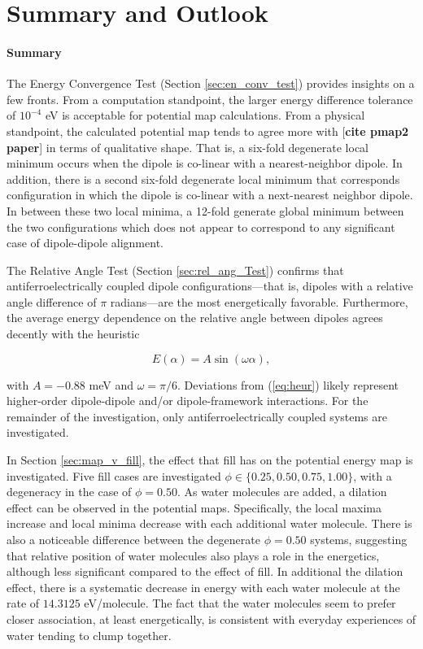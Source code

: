     \section{Summary and Outlook}
    
    \paragraph{Summary} The Energy Convergence Test (Section \ref{sec:en_conv_test}) provides insights on a few fronts. From a computation standpoint, the larger energy difference tolerance of $10^{-4}$ eV is acceptable for potential map calculations. From a physical standpoint, the calculated potential map tends to agree more with [\textbf{cite pmap2 paper}] in terms of qualitative shape. That is, a six-fold degenerate local minimum occurs when the dipole is co-linear with a nearest-neighbor dipole. In addition, there is a second six-fold degenerate local minimum that corresponds configuration in which the dipole is co-linear with a next-nearest neighbor dipole. In between these two local minima, a 12-fold generate global minimum between the two configurations which does not appear to correspond to any significant case of dipole-dipole alignment.
    
    The Relative Angle Test (Section \ref{sec:rel_ang_Test}) confirms that antiferroelectrically coupled dipole configurations---that is, dipoles with a relative angle difference of $\pi$ radians---are the most energetically favorable. Furthermore, the average energy dependence on the relative angle between dipoles agrees decently with the heuristic
    
    \begin{equation}
    \label{eq:heur}
        E(\alpha) = A \sin(\omega \alpha),
    \end{equation}
    
    \noindent with $A=-0.88$ meV and $\omega = \pi/6$. Deviations from (\ref{eq:heur}) likely represent higher-order dipole-dipole and/or dipole-framework interactions. For the remainder of the investigation, only antiferroelectrically coupled systems are investigated.
    
    In Section \ref{sec:map_v_fill}, the effect that fill has on the potential energy map is investigated. Five fill cases are investigated $\phi \in \{0.25,0.50,0.75,1.00\}$, with a degeneracy in the case of $\phi = 0.50$. As water molecules are added, a dilation effect can be observed in the potential maps. Specifically, the local maxima increase and local minima decrease with each additional water molecule. There is also a noticeable difference between the degenerate $\phi=0.50$ systems, suggesting that relative position of water molecules also plays a role in the energetics, although less significant compared to the effect of fill. In additional the dilation effect, there is a systematic decrease in energy with each water molecule at the rate of $14.3125$ eV/molecule. The fact that the water molecules seem to prefer closer association, at least energetically, is consistent with everyday experiences of water tending to clump together. 
    
